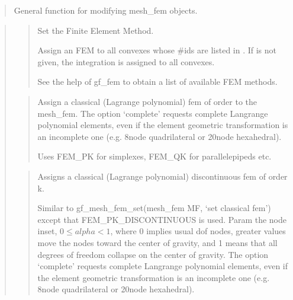 \documentclass[a4paper,11pt,english]{sphinxmanual}
\begin{document}
\begin{quote}

General function for modifying mesh\_fem objects.
\end{quote}

\begin{quote}

\begin{quote}

Set the Finite Element Method.

Assign an FEM  to all convexes whose \#ids are listed in .
If  is not given, the integration is assigned to all convexes.

See the help of gf\_fem to obtain a list of available FEM methods.
\end{quote}

\begin{quote}

Assign a classical (Lagrange polynomial) fem of order  to the mesh\_fem.
The option ‘complete’ requests complete Langrange polynomial elements,
even if the element geometric transformation is an incomplete one
(e.g. 8\sphinxhyphen{}node quadrilateral or 20\sphinxhyphen{}node hexahedral).

Uses FEM\_PK for simplexes, FEM\_QK for parallelepipeds etc.
\end{quote}

\begin{quote}

Assigns a classical (Lagrange polynomial) discontinuous fem of order k.

Similar to gf\_mesh\_fem\_set(mesh\_fem MF, ‘set classical fem’) except that
FEM\_PK\_DISCONTINUOUS is used. Param  the node inset,
\(0 \leq alpha < 1\), where 0 implies usual dof nodes, greater values
move the nodes toward the center of gravity, and 1 means that all
degrees of freedom collapse on the center of gravity.
The option ‘complete’ requests complete Langrange polynomial elements,
even if the element geometric transformation is an incomplete one
(e.g. 8\sphinxhyphen{}node quadrilateral or 20\sphinxhyphen{}node hexahedral).
\end{quote}


\end{quote}
\end{document}
